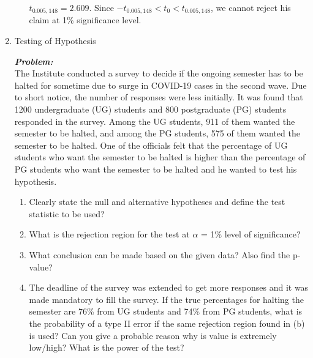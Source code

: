 \documentclass[12pt, oneside]{article}
\begin{document}
\begin{enumerate}
\begin{enumerate}
$t_{0.005,148} = 2.609$. Since  $ -t_{0.005,148}  < t_0 < t_{0.005,148} $, we cannot reject his claim at 1\% significance level.

\end{enumerate}





\item	 Testing of Hypothesis 

\textit{\textbf{Problem:}} \\
The Institute conducted a survey to decide if the ongoing semester has to be halted for sometime due to surge in COVID-19 cases in the second wave. Due to short notice, the number of responses were less initially. It was found that 1200 undergraduate (UG) students and 800 postgraduate (PG) students responded in the survey. Among the UG students, 911 of them wanted the semester to be halted, and among the PG students, 575 of them wanted the semester to be halted.
One of the officials felt that the percentage of UG students who want the semester to be halted is higher than the percentage of PG students who want the semester to be halted and he wanted to test his hypothesis.\\

\begin{enumerate}
    \item  Clearly state the null and alternative hypotheses and define the test statistic to be used?
    \item What is the rejection region for the test at $\alpha$ = 1\% level of significance?
    \item What conclusion can be made based on the given data? Also find the p-value?
    \item The deadline of the survey was extended to get more responses and it was made mandatory to fill the survey. If the true percentages for halting the semester are 76\% from UG students and 74\% from PG students, what is the probability of a type II error if the same rejection region found in (b) is used? Can you give a probable reason why is value is extremely low/high? What is the power of the test?
\end{enumerate}


\end{enumerate}
\end{document}
